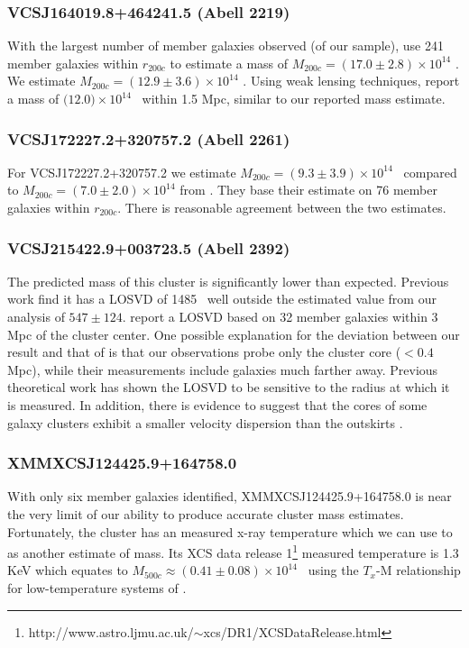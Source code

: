 \subsubsection{VCSJ164019.8+464241.5 (Abell 2219)}
With the largest number of member galaxies observed (of our sample), \cite{Sifon2015} use 241 member galaxies within $r_{200c}$ to estimate a mass of $M_{200c} = (17.0\pm2.8)\times 10^{14}$ \Msol. We estimate $M_{200c} = (12.9\pm3.6)\times 10^{14}$ \Msol. Using weak lensing techniques, \cite{Applegate2014} report a mass of $(12.0$$)\times 10^{14}$ \Msol\ within 1.5 Mpc, similar to our reported mass estimate.

\subsubsection{VCSJ172227.2+320757.2 (Abell 2261)}
For VCSJ172227.2+320757.2 we estimate $M_{200c} = (9.3\pm3.9)\times 10^{14}$ \Msol\ compared to $M_{200c} = (7.0\pm2.0)\times 10^{14}$ \Msol from \cite{Sifon2015}. They base their estimate on 76 member galaxies within $r_{200c}$. There is reasonable agreement between the two estimates.

\subsubsection{VCSJ215422.9+003723.5 (Abell 2392)}
The predicted mass of this cluster is significantly lower than expected. Previous work \citep{Wing2013} find it has a LOSVD of 1485 \kms\ well outside the estimated value from our analysis of $547\pm124$. \cite{Wing2013} report a LOSVD based on 32 member galaxies within 3 Mpc of the cluster center. One possible explanation for the deviation between our result and that of \cite{Wing2013} is that our observations probe only the cluster core ($<0.4$ Mpc), while their measurements include galaxies much farther away. Previous theoretical work  has shown the LOSVD to be sensitive to the radius at which it is measured. In addition, there is evidence to suggest that the cores of some galaxy clusters exhibit a smaller velocity dispersion than the outskirts .

\subsubsection{XMMXCSJ124425.9+164758.0}
With only six member galaxies identified, XMMXCSJ124425.9+164758.0 is near the very limit of our ability to produce accurate cluster mass estimates. Fortunately, the cluster has an measured x-ray temperature which we can use to as another estimate of mass. Its XCS data release 1\footnote{http://www.astro.ljmu.ac.uk/$\sim$xcs/DR1/XCSDataRelease.html} \citep{Mehrtens2012} measured temperature is 1.3 KeV which equates to $M_{500c}\approx(0.41\pm0.08)\times10^{14}$ \Msol\ using the $T_x$-M relationship for low-temperature systems of \cite{Finoguenov2001}.

